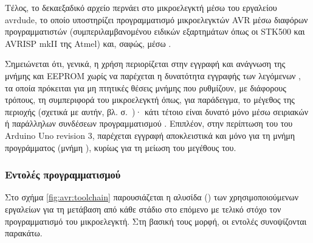 Τέλος, το δεκαεξαδικό αρχείο περνάει στο μικροελεγκτή μέσω του εργαλείου
avrdude, το
οποίο υποστηρίζει προγραμματισμό μικροελεγκτών AVR μέσω διαφόρων προγραμματιστών
(συμπεριλαμβανομένου ειδικών εξαρτημάτων όπως οι STK500 και AVRISP mkII της
Atmel) και, σαφώς, μέσω  \parencites[15]{avrlibc}{avrdude}.

Σημειώνεται ότι, γενικά, η χρήση  περιορίζεται στην εγγραφή και
ανάγνωση της μνήμης  και EEPROM χωρίς να παρέχεται η δυνατότητα
εγγραφής των λεγόμενων , τα οποία πρόκειται για μη πτητικές θέσεις
μνήμης που ρυθμίζουν, με διάφορους τρόπους, τη συμπεριφορά του μικροελεγκτή
όπως, για παράδειγμα, το μέγεθος της περιοχής  (σχετικά με
αυτήν, βλ.  σ.~\pageref{subsec:avr:progmem})· κάτι
τέτοιο είναι δυνατό μόνο μέσω σειριακών ή παράλληλων συνδέσεων προγραμματισμού
\parencite[273]{atmel13}.  Επιπλέον, στην περίπτωση του  του
Arduino Uno revision 3, παρέχεται εγγραφή αποκλειστικά και μόνο για τη μνήμη
προγράμματος (μνήμη ), κυρίως για τη μείωση του μεγέθους του.


\subsubsection{Εντολές προγραμματισμού}

Στο σχήμα \ref{fig:avr:toolchain} παρουσιάζεται η αλυσίδα () των
χρησιμοποιούμενων εργαλείων για τη μετάβαση από κάθε στάδιο στο επόμενο με
τελικό στόχο τον προγραμματισμό του μικροελεγκτή. Στη βασική τους μορφή, οι
εντολές συνοψίζονται παρακάτω.

